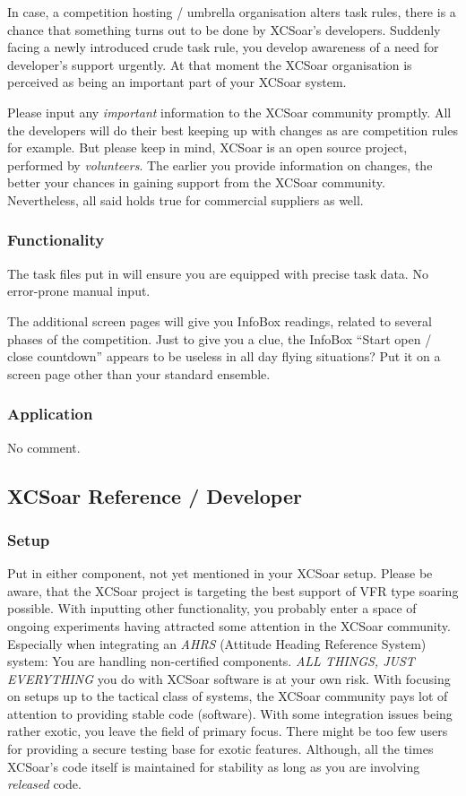 In case, a competition hosting / umbrella organisation alters task rules, there 
is a chance that something turns out to be done by XCSoar's developers. Suddenly
facing a newly introduced crude task rule, you develop awareness of
a need for developer's support urgently. At that moment the XCSoar organisation is
perceived as being an important part of your XCSoar system.

Please input any \emph{important} information to the XCSoar community promptly. 
All the developers will do their best keeping up with changes as are competition 
rules for example. But please keep in mind, XCSoar is an open source project, 
performed by \emph{volunteers}. The earlier you provide information on changes, 
the better your chances in gaining support from the XCSoar community. Nevertheless,
all said holds true for commercial suppliers as well.  

\subsubsection*{Functionality} The task files put in will ensure you are
equipped with precise task data. No error-prone manual input.

The additional screen pages will give you InfoBox readings, related to several 
phases of the competition. Just to give you a clue, the InfoBox ``Start open /
close countdown'' appears to be useless in all day flying situations? Put it on a
screen page other than your standard ensemble.

\subsubsection*{Application}
No comment.

\subsection*{XCSoar Reference / Developer}
\subsubsection*{Setup} Put in either component, not yet mentioned in your XCSoar 
setup. Please be aware, that the XCSoar project is targeting the best support of 
VFR type soaring possible. With inputting other functionality, you probably enter 
a space of ongoing experiments having attracted some attention in the XCSoar 
community. Especially when integrating an \emph{AHRS} (Attitude Heading Reference System) system: You are handling
non-certified components. \tip \emph{ALL THINGS, JUST EVERYTHING} you do with 
XCSoar software is at your own risk. With focusing on setups up to the tactical
class of systems, the XCSoar community pays lot of attention to providing stable
code (software). With some integration issues being rather exotic, you leave the 
field of primary focus. There might be too few users for providing
a secure testing base for exotic features. Although, all the times XCSoar's code 
itself is maintained for stability as long as you are involving \emph{released} 
code.


